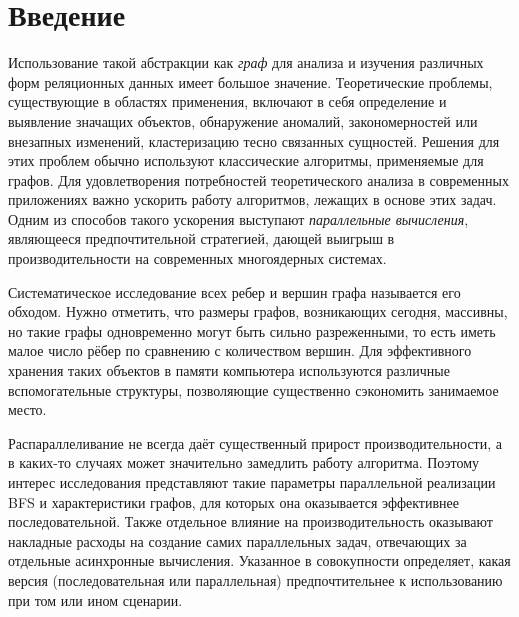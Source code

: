 
\section*{Введение}
Использование такой абстракции как \textit{граф} для анализа и изучения различных форм реляционных данных имеет большое значение. Теоретические проблемы, существующие в областях применения, включают в себя определение и выявление значащих объектов, обнаружение аномалий, закономерностей или внезапных изменений, кластеризацию тесно связанных сущностей. Решения для этих проблем обычно используют классические алгоритмы, применяемые для графов. Для удовлетворения потребностей теоретического анализа в современных приложениях важно ускорить работу алгоритмов, лежащих в основе этих задач. Одним из способов такого ускорения выступают \textit{параллельные вычисления}, являющееся предпочтительной стратегией, дающей выигрыш в производительности на современных многоядерных системах.

Систематическое исследование всех ребер и вершин графа называется его обходом. Нужно отметить, что размеры графов, возникающих сегодня, массивны, но такие графы одновременно могут быть сильно разреженными, то есть иметь малое число рёбер по сравнению с количеством вершин. Для эффективного хранения таких объектов в памяти компьютера используются различные вспомогательные структуры, позволяющие существенно сэкономить занимаемое место.

Распараллеливание не всегда даёт существенный прирост производительности, а в каких-то случаях может значительно замедлить работу алгоритма. Поэтому интерес исследования представляют такие параметры параллельной реализации BFS и характеристики графов, для которых она оказывается эффективнее последовательной. Также отдельное влияние на производительность оказывают накладные расходы на создание самих параллельных задач, отвечающих за отдельные асинхронные вычисления. Указанное в совокупности определяет, какая версия (последовательная или параллельная) предпочтительнее к использованию при том или ином сценарии.
